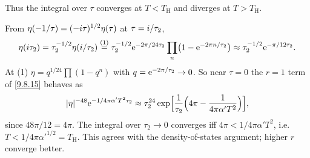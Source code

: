 Thus the integral over $\tau$ converges at $T<T_{\mathrm{H}}$ and diverges at $T>T_{\mathrm{H}}$.
\begin{tcolorbox}[breakable]
	\begin{remark}
		From $\eta(-1/\tau)=(-i\tau)^{1/2}\eta(\tau)$ at $\tau=i/\tau_2$,
		\begin{equation*}
			\eta(i\tau_2)=\tau_2^{-1/2}\eta(i/\tau_2)\overset{(1)}{=}\tau_2^{-1/2}\mathrm{e}^{-2\pi/24\tau_2}\prod_n\bigl(1-\mathrm{e}^{-2\pi n/\tau_2}\bigr)\approx\tau_2^{-1/2}\mathrm{e}^{-\pi/12\tau_2} .
		\end{equation*}
		At (1) $\eta=q^{1/24}\prod(1-q^n)$ with $q=\mathrm{e}^{-2\pi/\tau_2}\to0$. So near $\tau=0$ the $r=1$ term of \eqref{9.8.15} behaves as
		\begin{equation*}
			|\eta|^{-48}\mathrm{e}^{-1/4\pi\alpha'T^2\tau_2}\approx\tau_2^{24}\exp\Bigl[\frac{1}{\tau_2}\Bigl(4\pi-\frac{1}{4\pi\alpha'T^2}\Bigr)\Bigr],
		\end{equation*}
		since $48\pi/12=4\pi$. The integral over $\tau_2\to0$ converges iff $4\pi<1/4\pi\alpha'T^2$, i.e.\ $T<1/4\pi\alpha'^{1/2}=T_{\mathrm H}$. This agrees with the density-of-states argument; higher $r$ converge better.
	\end{remark}
\end{tcolorbox}

